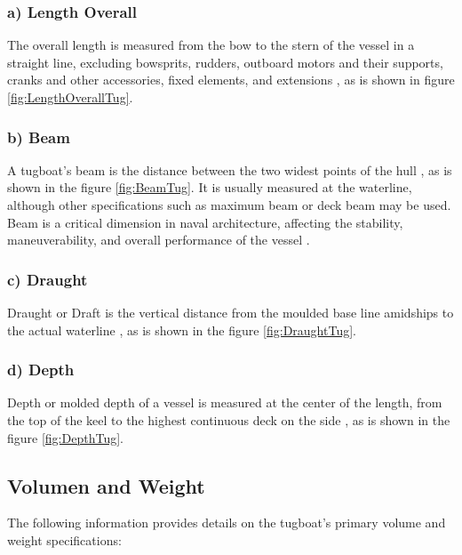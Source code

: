 \subsubsection{a) Length Overall}

The overall length is measured from the bow to the stern of the vessel in a straight line, excluding bowsprits, rudders, outboard motors and their supports, cranks and other accessories, fixed elements, and extensions \cite{wleonline}, as is shown in figure \ref{fig:LengthOverallTug}.

\subsubsection{b) Beam}

A tugboat's beam is the distance between the two widest points of the hull \cite{HZContainer}, as is shown in the figure \ref{fig:BeamTug}. It is usually measured at the waterline, although other specifications such as maximum beam or deck beam may be used. Beam is a critical dimension in naval architecture, affecting the stability, maneuverability, and overall performance of the vessel \cite{DiscoverBoating}.

\subsubsection{c) Draught}

Draught or Draft is the vertical distance from the moulded base line amidships to the actual waterline \cite{Wartsila}, as is shown in the figure \ref{fig:DraughtTug}.

\subsubsection{d) Depth}

Depth or molded depth of a vessel is measured at the center of the length, from the top of the keel to the highest continuous deck on the side \cite{Wartsila}, as is shown in the figure \ref{fig:DepthTug}.



\subsection{Volumen and Weight}\label{sec:VW}

The following information provides details on the tugboat’s primary volume and weight specifications:

